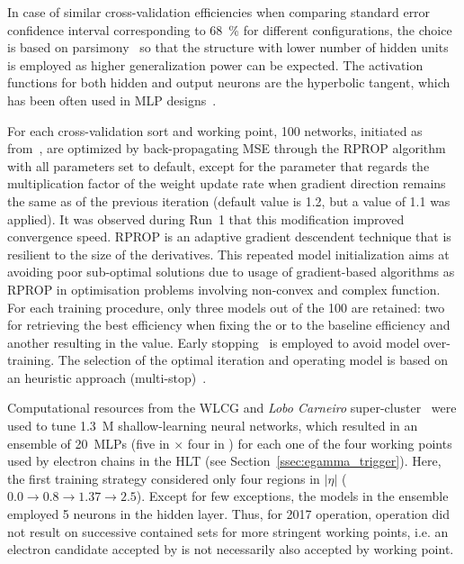 In case of similar cross-validation efficiencies when comparing standard
error confidence interval corresponding to \SI{68}{\%} for different
configurations, the choice is based on
parsimony~\cite{haykin_2008, medeiros2001statistical} so that the structure with lower number of hidden units
is employed as higher generalization power can be expected. The activation
functions for both hidden and output neurons are the hyperbolic tangent, which has been often used in MLP designs~\cite{haykin_2008}.






For each cross-validation sort and working point, 100 networks, initiated
as from~\cite{initnw}, are optimized by back-propagating MSE through the RPROP
algorithm~\cite{rprop} with all parameters set to default,
except for the parameter that regards the multiplication factor of the weight update rate when gradient direction remains the same as of the previous iteration (default value is 1.2, but a value of 1.1 was applied). It was 
observed during Run~1 that this modification improved convergence speed. RPROP
is an adaptive gradient descendent technique that is resilient to the size of
the derivatives. This repeated model initialization aims at
avoiding poor sub-optimal solutions due to usage of gradient-based algorithms as
RPROP in optimisation problems involving non-convex and complex function.
For each training procedure, only three models out of the 100 are retained: two
for retrieving the best efficiency when fixing the \pd{} or \pf{} to the
baseline \fastcalo{} efficiency and another resulting in the \spmax{} value.
Early stopping~\cite{haykin_2008} is employed to avoid model over-training. The
selection of the optimal iteration and operating model is based on an heuristic approach (multi-stop)~\cite{Goodfellow2016}.


Computational resources from the WLCG and \emph{Lobo Carneiro}
super-cluster~\cite{lobo_carneiro} were used to tune 1.3~M shallow-learning
neural networks, which resulted in an ensemble of \SI{20}{MLPs} (five in \et{}
$\times$ four in \abseta{}) for each one of the four working points used by
electron chains in the HLT (see Section~\ref{ssec:egamma_trigger}).
Here, the first training strategy considered only four regions in $|\eta|$ ($0.0\rightarrow 0.8\rightarrow1.37\rightarrow2.5$).
Except for few exceptions, the models in the ensemble employed 5 neurons in the 
hidden layer.  Thus, for 2017 operation, 
\rnn{} operation did not result on
successive contained sets for more stringent working points, i.e. an electron
candidate accepted by \medium{} is not necessarily also accepted by \loose{}
working point. %


